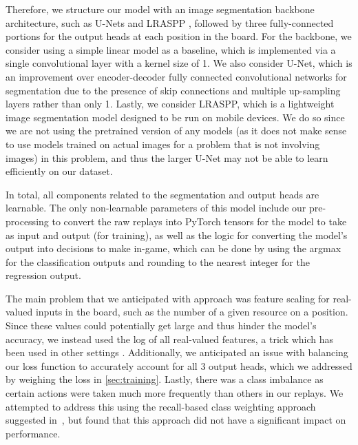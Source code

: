 \documentclass[10pt,twocolumn,letterpaper]{article}
\begin{document}
Therefore, we structure our model with an image segmentation
backbone architecture, such as U-Nets \cite{u-net} and LRASPP
\cite{lraspp}, followed by three fully-connected portions for
the output heads at each position in the board.
For the backbone, we consider using a simple linear model as a baseline, which
is implemented via a single convolutional layer with a kernel size of 1.
We also consider U-Net, which is an improvement over encoder-decoder fully
connected convolutional networks for segmentation due to the presence
of skip connections and multiple up-sampling layers rather than only 1.
Lastly, we consider LRASPP, which is a lightweight image
segmentation model designed to be run on mobile devices.
We do so since we are not using the pretrained version of any models
(as it does not make sense to use models trained on actual images for
a problem that is not involving images) in this problem, and thus the
larger U-Net may not be able to learn efficiently on our dataset.

In total, all components related to the
segmentation and output heads are learnable.
The only non-learnable parameters of this model include
our pre-processing to convert the raw replays into PyTorch tensors for the
model to take as input and output (for training), as well as the logic for
converting the model's output into decisions to make in-game, which can be
done by using the argmax for the classification outputs and rounding to the
nearest integer for the regression output.

The main problem that we anticipated with approach was
feature scaling for real-valued inputs in the board,
such as the number of a given resource on a position.
Since these values could potentially get large and thus hinder the
model's accuracy, we instead used the log of all real-valued features,
a trick which has been used in other settings \cite{scaling}.
Additionally, we anticipated an issue with balancing our loss
function to accurately account for all 3 output heads, which
we addressed by weighing the loss in \autoref{sec:training}.
Lastly, there was a class imbalance as certain actions were
taken much more frequently than others in our replays.
We attempted to address this using the recall-based class
weighting approach suggested in~\cite{imbalance}, but found that
this approach did not have a significant impact on performance.
\end{document}
